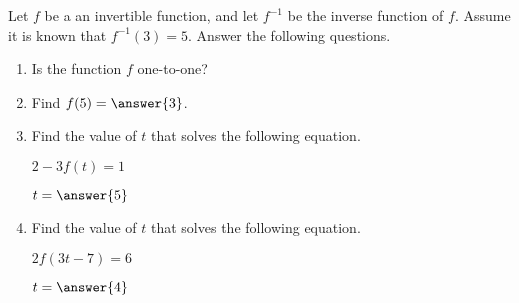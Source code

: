 \documentclass{ximera}
\author{Elizabeth Miller}
\begin{document}
Let $f$ be a an invertible function, and let $f^{-1}$ be the inverse function of $f$.  Assume it is known that $f^{-1}(3)=5$.  Answer the following questions.

\begin{exercise}
\begin{enumerate}
\item Is the function $f$ one-to-one?
\begin{multipleChoice}
\end{multipleChoice}

\item  Find $f(5)=\answer{3}$.

\item Find the value of $t$ that solves the following equation.

$2-3f(t)=1$

$t=\answer{5}$

\item Find the value of $t$ that solves the following equation.

$2f(3t-7)=6$

$t=\answer{4}$

\end{enumerate}

\end{exercise}
\end{document}
